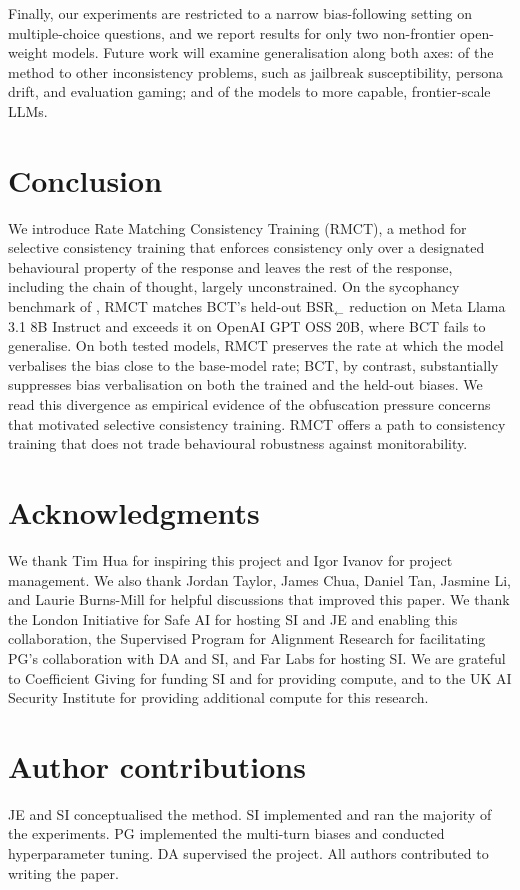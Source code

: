 \documentclass{article}
\begin{document}
Finally, our experiments are restricted to a narrow bias-following setting on
multiple-choice questions, and we report results for only two
non-frontier open-weight models. Future work will examine
generalisation along both axes: of the method to other inconsistency
problems, such as jailbreak susceptibility, persona drift, and
evaluation gaming; and of the models to more capable,
frontier-scale LLMs. 

\section{Conclusion}
We introduce Rate Matching Consistency Training (RMCT), a
method for selective consistency training that enforces consistency
only over a designated behavioural property of the response and
leaves the rest of the response, including the chain of thought,
largely unconstrained. On the sycophancy benchmark of
\citet{chua_bias-augmented_2024}, RMCT matches BCT's held-out
$\text{BSR}_{\leftarrow}$ reduction on Meta Llama 3.1 8B Instruct
and exceeds it on OpenAI GPT OSS 20B, where BCT fails to generalise.
On both tested models, RMCT preserves the rate at which the model verbalises the bias close to the base-model rate;
BCT, by contrast, substantially suppresses bias verbalisation on both
the trained and the held-out biases. We read this divergence as empirical evidence of the obfuscation pressure concerns that motivated
selective consistency training. RMCT offers a path to consistency training that does not trade
behavioural robustness against monitorability.

\fi
\section*{Acknowledgments}
We thank Tim Hua for inspiring this project and Igor Ivanov for
project management. We also thank Jordan Taylor, James Chua, Daniel Tan, Jasmine Li, and Laurie Burns-Mill for helpful discussions that improved this paper. We
thank the London Initiative for Safe AI for hosting SI and JE and
enabling this collaboration, the Supervised Program for Alignment
Research for facilitating PG's collaboration with DA and SI, and Far Labs for hosting SI. We are
grateful to Coefficient Giving for funding SI and for providing
compute, and to the UK AI Security Institute for providing additional
compute for this research.

\section*{Author contributions}
JE and SI conceptualised the method. SI implemented and ran the
majority of the experiments. PG implemented the multi-turn biases and
conducted hyperparameter tuning. DA supervised the project. All
authors contributed to writing the paper.
\end{document}
